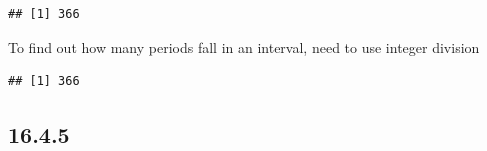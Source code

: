 \documentclass[]{book}
\newenvironment{Shaded}{\begin{snugshade}}{\end{snugshade}}
\newcommand{\DecValTok}[1]{\textcolor[rgb]{0.00,0.00,0.81}{#1}}
\newcommand{\KeywordTok}[1]{\textcolor[rgb]{0.13,0.29,0.53}{\textbf{#1}}}
\newcommand{\NormalTok}[1]{#1}
\newcommand{\OperatorTok}[1]{\textcolor[rgb]{0.81,0.36,0.00}{\textbf{#1}}}
\newcommand{\StringTok}[1]{\textcolor[rgb]{0.31,0.60,0.02}{#1}}
\theoremstyle{definition}
\theoremstyle{definition}
\theoremstyle{definition}
\theoremstyle{remark}
\begin{document}
\begin{Shaded}
\end{Shaded}

\begin{verbatim}
## [1] 366
\end{verbatim}

To find out how many periods fall in an interval, need to use integer
division

\begin{Shaded}
\end{Shaded}

\begin{verbatim}
## [1] 366
\end{verbatim}

\hypertarget{section-58}{%
\subsection{16.4.5}\label{section-58}}
\end{document}
